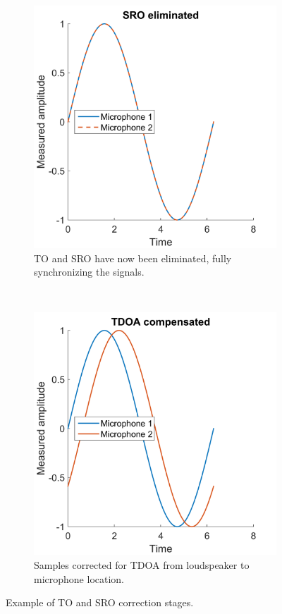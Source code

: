 \documentclass[a4paper, notitlepage]{report}
\begin{document}
\begin{figure}[hbt]
\begin{adjustwidth}{-1in}{-1in}
	
	\begin{subfigure}{0.25\paperwidth}
		\includegraphics[width=\textwidth]{figures/sro-example/synchronized}
		\caption{TO and SRO have now been eliminated, fully synchronizing the signals.}
		\label{fig:sync-ex3}
	\end{subfigure}
	~
	\begin{subfigure}{0.25\paperwidth}
		\includegraphics[width=\textwidth]{figures/sro-example/tdoa-compensated}
		\caption{Samples corrected for TDOA from loudspeaker to microphone location.}
		\label{fig:sync-ex4}
	\end{subfigure}
\end{adjustwidth}
\caption[TO and SRO correction stages.]{Example of TO and SRO correction stages.}
\label{fig:synchronization-example}
\end{figure}
\end{document}
